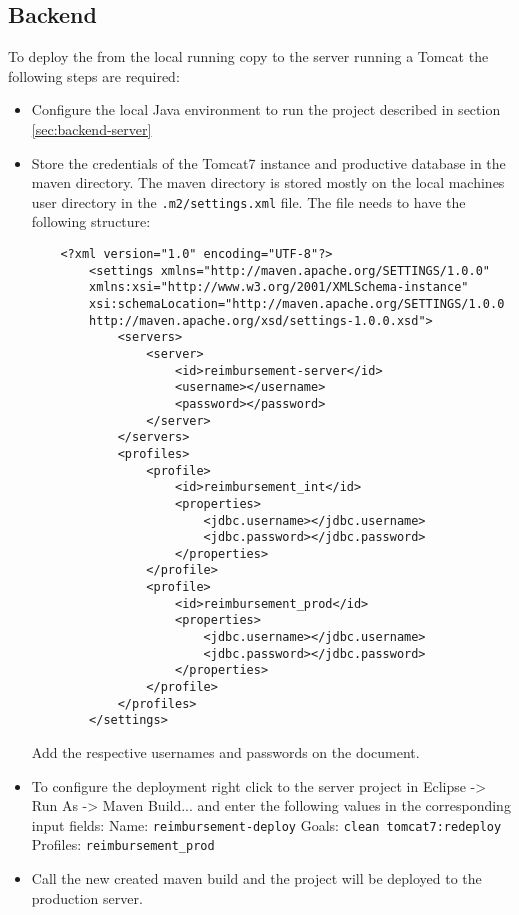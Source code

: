 \subsection{Backend}

To deploy the from the local running copy to the server running a Tomcat the following steps are required:

\begin{itemize}
    \item Configure the local Java environment to run the project described in section \ref{sec:backend-server} 
    \item Store the credentials of the Tomcat7 instance and productive database in the maven directory. The maven directory is stored mostly on the local machines user directory in the \texttt{.m2/settings.xml} file. The file needs to have the following structure:

    \begin{lstlisting}
    <?xml version="1.0" encoding="UTF-8"?>
        <settings xmlns="http://maven.apache.org/SETTINGS/1.0.0"
        xmlns:xsi="http://www.w3.org/2001/XMLSchema-instance"
        xsi:schemaLocation="http://maven.apache.org/SETTINGS/1.0.0      
        http://maven.apache.org/xsd/settings-1.0.0.xsd">
        	<servers>
        		<server>
        			<id>reimbursement-server</id>
        			<username></username>
        			<password></password>
        		</server>
        	</servers>
        	<profiles>
        		<profile>
        			<id>reimbursement_int</id>
        			<properties>
        				<jdbc.username></jdbc.username>
        				<jdbc.password></jdbc.password>
        			</properties>
        		</profile>
        		<profile>
        			<id>reimbursement_prod</id>
        			<properties>
        				<jdbc.username></jdbc.username>
        				<jdbc.password></jdbc.password>
        			</properties>
        		</profile>
        	</profiles>
        </settings>
    \end{lstlisting}
    
    Add the respective usernames and passwords on the document.
    
    \item To configure the deployment right click to the server project in Eclipse -> Run As -> Maven Build... and enter the following values in the corresponding input fields:
    \newline
    Name: \texttt{reimbursement-deploy}
    \newline
    Goals: \texttt{clean tomcat7:redeploy}
    \newline
    Profiles: \texttt{reimbursement\_prod}
    \item Call the new created maven build and the project will be deployed to the production server.  
    
\end{itemize}
    
